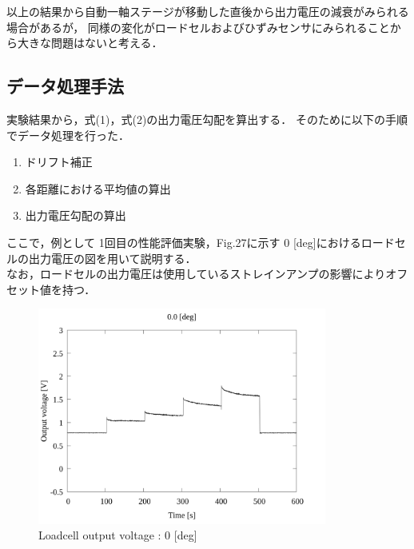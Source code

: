 
\newpage

以上の結果から自動一軸ステージが移動した直後から出力電圧の減衰がみられる場合があるが，
同様の変化がロードセルおよびひずみセンサにみられることから大きな問題はないと考える．

\subsection{データ処理手法}

実験結果から，式(1)，式(2)の出力電圧勾配を算出する．
そのために以下の手順でデータ処理を行った．

\begin{enumerate}[(1)]
  \item ドリフト補正
  \item 各距離における平均値の算出
  \item 出力電圧勾配の算出
\end{enumerate}

ここで，例として 1回目の性能評価実験，Fig.27に示す 0 [deg]におけるロードセルの出力電圧の図を用いて説明する．\\
なお，ロードセルの出力電圧は使用しているストレインアンプの影響によりオフセット値を持つ．

\begin{figure}[htbp]
  \footnotesize
  \begin{center}
    \includegraphics[width=95mm]{../../02_workspace/result/2-1/plot/01-1_loadcell/01_loadcell_0.png}
    \caption{Loadcell output voltage : 0 [deg]}
  \end{center}
\end{figure}


